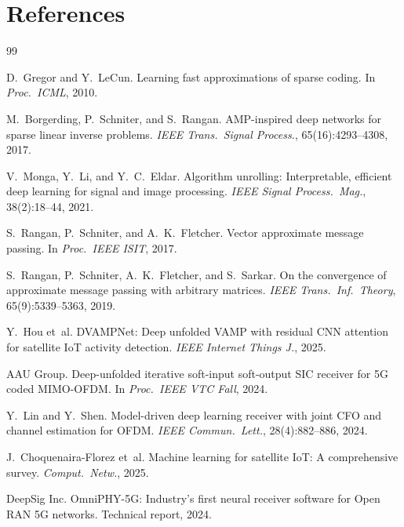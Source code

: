\documentclass{article}
\begin{document}

\section*{References}
{\small
\begin{thebibliography}{99}

D.~Gregor and Y.~LeCun.
\newblock Learning fast approximations of sparse coding.
\newblock In \emph{Proc.\ ICML}, 2010.

M.~Borgerding, P.~Schniter, and S.~Rangan.
\newblock AMP-inspired deep networks for sparse linear inverse problems.
\newblock \emph{IEEE Trans.\ Signal Process.}, 65(16):4293--4308, 2017.

V.~Monga, Y.~Li, and Y.~C.~Eldar.
\newblock Algorithm unrolling: Interpretable, efficient deep learning for signal and image processing.
\newblock \emph{IEEE Signal Process.\ Mag.}, 38(2):18--44, 2021.

S.~Rangan, P.~Schniter, and A.~K.~Fletcher.
\newblock Vector approximate message passing.
\newblock In \emph{Proc.\ IEEE ISIT}, 2017.

S.~Rangan, P.~Schniter, A.~K.~Fletcher, and S.~Sarkar.
\newblock On the convergence of approximate message passing with arbitrary matrices.
\newblock \emph{IEEE Trans.\ Inf.\ Theory}, 65(9):5339--5363, 2019.

Y.~Hou et~al.
\newblock DVAMPNet: Deep unfolded VAMP with residual CNN attention for satellite IoT activity detection.
\newblock \emph{IEEE Internet Things J.}, 2025.

AAU Group.
\newblock Deep-unfolded iterative soft-input soft-output SIC receiver for 5G coded MIMO-OFDM.
\newblock In \emph{Proc.\ IEEE VTC Fall}, 2024.

Y.~Lin and Y.~Shen.
\newblock Model-driven deep learning receiver with joint CFO and channel estimation for OFDM.
\newblock \emph{IEEE Commun.\ Lett.}, 28(4):882--886, 2024.

J.~Choquenaira-Florez et~al.
\newblock Machine learning for satellite IoT: A comprehensive survey.
\newblock \emph{Comput.\ Netw.}, 2025.

DeepSig Inc.
\newblock OmniPHY-5G: Industry's first neural receiver software for Open RAN 5G networks.
\newblock Technical report, 2024.


\end{thebibliography}}
\end{document}
